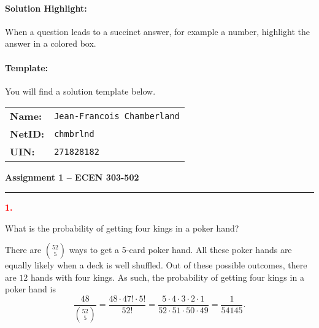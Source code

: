 \documentclass[11pt]{article}
\begin{document}
\paragraph{Solution Highlight:}
When a question leads to a succinct answer, for example a number, highlight the answer in a colored box.

\noindent
{}


\paragraph{Template:}
You will find a solution template below.


\newpage


\noindent
\begin{tabular}{ll}
\textbf{Name:} & \texttt{Jean-Francois Chamberland} \\
\textbf{NetID:} & \texttt{chmbrlnd} \\
\textbf{UIN:} & \texttt{271828182}
\end{tabular}

\vspace{5mm}

\begin{center}
\begin{Large}
\textbf{Assignment 1 -- ECEN 303-502}
\end{Large}
\end{center}

\vspace{5mm}

\noindent
\textcolor{red}{\rule[1mm]{\linewidth}{1pt}}
\begin{Large}
\textcolor{red}{\textbf{1.}}
\end{Large}
What is the probability of getting four kings in a poker hand?

\vspace{5mm}

There are $\binom{52}{5}$ ways to get a 5-card poker hand.
All these poker hands are equally likely when a deck is well shuffled.
Out of these possible outcomes, there are $12$ hands with four kings.
As such, the probability of getting four kings in a poker hand is
\begin{equation*}
\frac{48}{\binom{52}{5}}
= \frac{48 \cdot 47! \cdot 5!}{52!}
= \frac{5 \cdot 4 \cdot 3 \cdot 2 \cdot 1}{52 \cdot 51 \cdot 50 \cdot 49}
= \frac{1}{54 145} .
\end{equation*}

\noindent
{}
\end{document}
